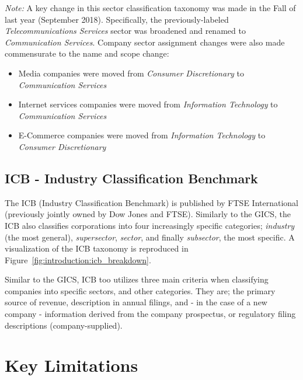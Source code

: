 \documentclass[../main.tex]{subfiles}
\begin{document}
\textit{Note:} A key change in this sector classification taxonomy was made in the Fall of last year (September 2018). Specifically, the previously-labeled \textit{Telecommunications Services} sector was broadened and renamed to \textit{Communication Services}. Company sector assignment changes were also made commensurate to the name and scope change:

\begin{itemize}
    \item Media companies were moved from \textit{Consumer Discretionary} to \textit{Communication Services}
    \item Internet services companies were moved from \textit{Information Technology} to \textit{Communication Services}
    \item E-Commerce companies were moved from \textit{Information Technology} to \textit{Consumer Discretionary}
\end{itemize}

\subsection{ICB - Industry Classification Benchmark}

The ICB (Industry Classification Benchmark) is published by FTSE International (previously jointly owned by Dow Jones and FTSE). Similarly to the GICS, the ICB also classifies corporations into four increasingly specific categories; \textit{industry} (the most general), \textit{supersector}, \textit{sector}, and finally \textit{subsector}, the most specific. A visualization of the ICB taxonomy is reproduced in Figure~\ref{fig:introduction:icb_breakdown}.


Similar to the GICS, ICB too utilizes three main criteria when classifying companies into specific sectors, and other categories. They are; the primary source of revenue, description in annual filings, and - in the case of a new company - information derived from the company prospectus, or regulatory filing descriptions (company-supplied).


\section{Key Limitations} \label{introduction:key_limitations}
\end{document}
